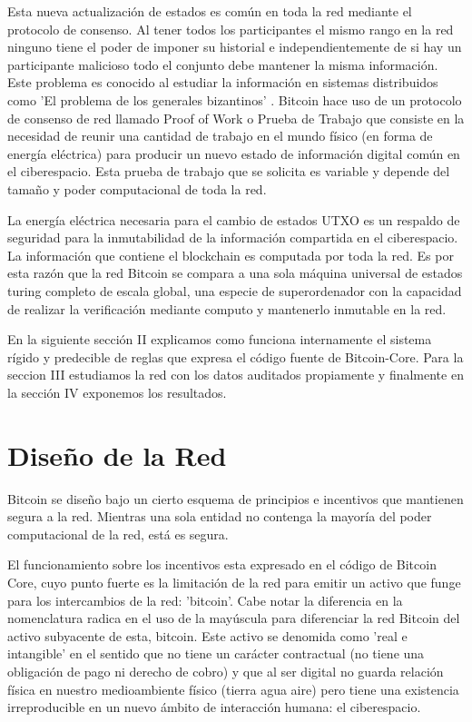 \documentclass{rbf}
\begin{document}
Esta nueva actualización de estados es común en toda la red mediante el protocolo de consenso. Al tener todos los participantes el mismo rango en la red ninguno tiene el poder de imponer su historial e independientemente de si hay un participante malicioso todo el conjunto debe mantener la misma información. Este problema es conocido al estudiar la información en sistemas distribuidos como 'El problema de los generales bizantinos' \cite{bizantinos}. Bitcoin hace uso de un protocolo de consenso de red llamado Proof of Work o Prueba de Trabajo que consiste en la necesidad de reunir una cantidad de trabajo en el mundo físico (en forma de energía eléctrica) para producir un nuevo estado de información digital común en el ciberespacio. Esta prueba de trabajo que se solicita es variable y depende del tamaño y poder computacional de toda la red.

La energía eléctrica necesaria para el cambio de estados UTXO es un respaldo de seguridad para la inmutabilidad 
de la información compartida en el ciberespacio. La información que contiene el blockchain es computada por toda la red. Es por esta razón que la red Bitcoin se compara a una sola máquina universal de estados turing completo de escala global, una especie de superordenador con la capacidad de realizar la verificación mediante computo y mantenerlo inmutable en la red.


En la siguiente sección II explicamos como funciona internamente el sistema rígido y predecible de reglas que expresa el código fuente de Bitcoin-Core.  Para la seccion III estudiamos la red con los datos auditados propiamente y finalmente en la sección IV exponemos los resultados.


\section{Diseño de la Red}

Bitcoin se diseño bajo un cierto esquema de principios e incentivos que mantienen segura a la red. Mientras una sola entidad no contenga la mayoría del poder computacional de la red, está es segura. 

El funcionamiento sobre los incentivos esta expresado en el código de Bitcoin Core, cuyo punto fuerte es la limitación de la red para emitir un activo que funge para los intercambios de la red: 'bitcoin'. Cabe notar la diferencia en la nomenclatura radica en el uso de la mayúscula para diferenciar la red Bitcoin del activo subyacente de esta, bitcoin. Este activo se denomida como 'real e intangible' en el sentido que no tiene un carácter contractual (no tiene una obligación de pago ni derecho de cobro) y que al ser digital no guarda relación física en nuestro medioambiente físico (tierra agua aire) pero tiene una existencia irreproducible en un nuevo ámbito de interacción humana: el ciberespacio. 
\end{document}
